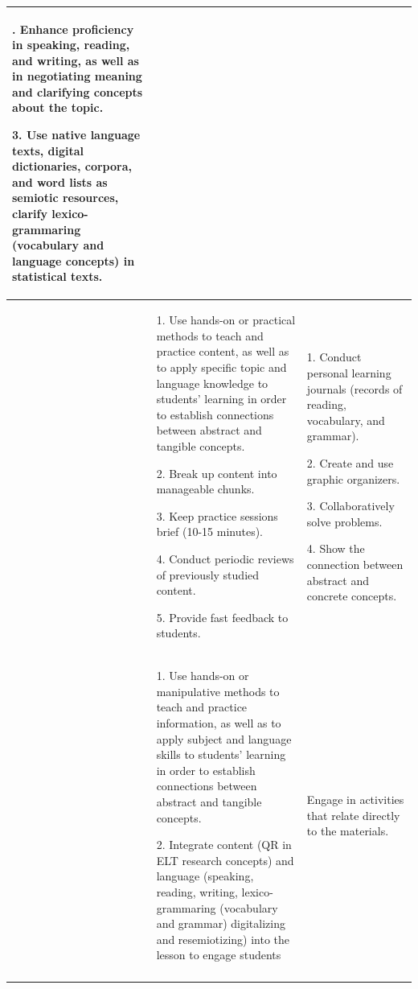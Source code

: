 \documentclass[english]{textolivre}
\begin{document}
\begin{small}
\begin{longtable}{
    >{\raggedright\arraybackslash}p{}
    p{}
    p{}
    }
2. Enhance proficiency in speaking, reading, and writing, as well as in negotiating meaning and clarifying concepts about the topic.
    
3. Use native language texts, digital dictionaries, corpora, and word lists as semiotic resources, clarify lexico-grammaring (vocabulary and language concepts) in statistical texts. \\
\midrule

\parbox[t]{2.5mm}{}
 &     
1. Use hands-on or practical methods to teach and practice content, as well as to apply specific topic and language knowledge to students' learning in order to establish connections between abstract and tangible concepts.

2. Break up content into manageable chunks.
    
3. Keep practice sessions brief (10-15 minutes).
    
4. Conduct periodic reviews of previously studied content.
    
5. Provide fast feedback to students. &     

1. Conduct personal learning journals (records of reading, vocabulary, and grammar).
    
2.  Create and use graphic organizers.
    
3. Collaboratively solve problems.
    
4. Show the connection between abstract and concrete concepts. \\

\midrule

\parbox[t]{2.5mm}{}

&     
1. Use hands-on or manipulative methods to teach and practice information, as well as to apply subject and language skills to students' learning in order to establish connections between abstract and tangible concepts.

2. Integrate content (QR in ELT research concepts) and language (speaking, reading, writing, lexico-grammaring (vocabulary and grammar)  digitalizing and resemiotizing) into the lesson to engage students & Engage in activities that relate directly to the materials. \\
\midrule

\parbox[t]{2.5mm}{}


\end{longtable}
\end{small}
\end{document}
